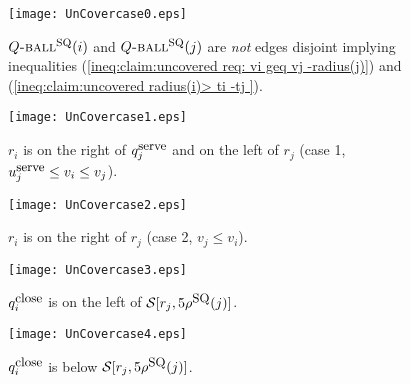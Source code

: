 \documentclass[11pt]{article}
\newcommand{\calS}{\mathcal{S}}
\newcommand{\qSQ}{q^{\mbox{\small\upshape serve}}}
\newcommand{\uSQ}{u^{\mbox{\small\upshape serve}}}
\newcommand{\qclose}{q^{\mbox{\small\upshape close}}}
\newcommand{\rhoSQ}[0]{\rho^{\mbox{\small\upshape SQ}}}
\newcommand{\seq}[1]{\calS[#1]}
\newcommand{\SQball}[0]{Q{\mbox{\sc -ball}}^{\mbox{\sc sq}}}
\begin{document}
\begin{figure}
\begin{center}
\texttt{[image: UnCovercase0.eps]}
\end{center}
\caption{\sf
$\SQball(i)$ and $\SQball(j)$ are {\em not} edges disjoint implying inequalities
(\ref{ineq:claim:uncovered req: vi geq vj -radius(j)}) and (\ref{ineq:claim:uncovered radius(i)> ti -tj }).
\label{fig:UnCovercase0}
}
\end{figure}
\begin{figure}[ht]
\begin{center}
\texttt{[image: UnCovercase1.eps]}
\end{center}
\caption{\sf
\label{fig:UnCovercase1}
$r_i$ is on the right of $\qSQ_j$ and on the left of $r_j$ (case 1, $\uSQ_j \leq v_i\leq v_j$).
}
\end{figure}
\begin{figure}[ht]
\begin{center}
\texttt{[image: UnCovercase2.eps]}
\end{center}
\caption{\sf
\label{fig:UnCovercase2}
$r_i$ is on the right of $r_j$ (case 2, $v_j\leq v_i$).
}
\end{figure}
\begin{figure}
\begin{center}
\texttt{[image: UnCovercase3.eps]}
\end{center}
\caption{\sf
\label{fig:UnCovercase3}
$\qclose_i$ is on the left of $\seq{r_j,5\rhoSQ(j)}$.
}
\end{figure}
\begin{figure}[ht]
\begin{center}
\texttt{[image: UnCovercase4.eps]}
\end{center}
\caption{\sf
\label{fig:UnCovercase4}
$\qclose_i$ is below $\seq{r_j,5\rhoSQ(j)}$.
}
\end{figure}
\end{document}
